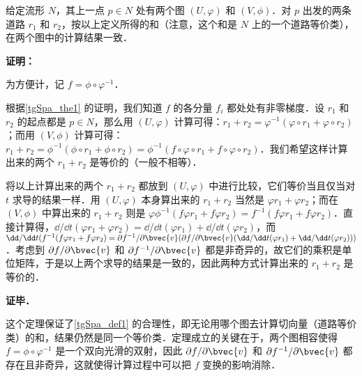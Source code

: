 \begin{theorem}{}
给定流形 $N$，其上一点 $p\in N$ 处有两个图 $(U, \varphi)$ 和 $(V, \phi)$．对 $p$ 出发的两条道路 $r_1$ 和 $r_2$，按以上定义所得的和（注意，这个和是 $N$ 上的一个道路等价类），在两个图中的计算结果一致．
\end{theorem}

\textbf{证明：}

为方便计，记 $f=\phi\circ\varphi^{-1}$．

根据\autoref{tgSpa_the1} 的证明，我们知道 $f$ 的各分量 $f_i$ 都处处有非零梯度．设 $r_1$ 和 $r_2$ 的起点都是 $p\in N$，那么用 $(U, \varphi)$ 计算可得：$r_1+r_2=\varphi^{-1}(\varphi\circ r_1+\varphi\circ r_2)$；而用 $(V, \phi)$ 计算可得：$r_1+r_2=\phi^{-1}(\phi\circ r_1+\phi\circ r_2)=\phi^{-1}(f\circ\varphi\circ r_1+f\circ\varphi\circ r_2)$．我们希望这样计算出来的两个 $r_1+r_2$ 是等价的（一般不相等）．

将以上计算出来的两个 $r_1+r_2$ 都放到 $(U, \varphi)$ 中进行比较，它们等价当且仅当对 $t$ 求导的结果一样．用 $(U, \varphi)$ 本身算出来的 $r_1+r_2$ 当然是 $\varphi r_1+\varphi r_2$；而在 $(V, \phi)$ 中算出来的 $r_1+r_2$ 则是 $\varphi\phi^{-1}(f\varphi r_1+f\varphi r_2)=f^{-1}(f\varphi r_1+f\varphi r_2)$．直接计算得，$\dd/\dd t(\varphi r_1+\varphi r_2)=\dd/\dd t(\varphi r_1)+\dd/\dd t(\varphi r_2)$，而 $\dd/\dd t(f^{-1}(f\varphi r_1+f\varphi r_2)=\partial f^{-1}/\partial\bvec{v}(\partial f/\partial\bvec{v}(\dd/\dd t(\varphi r_1)+\dd/\dd t(\varphi r_2)))$．考虑到 $\partial f/\partial\bvec{v}$ 和 $\partial f^{-1}/\partial\bvec{v}$ 都是非奇异的，故它们的乘积是单位矩阵，于是以上两个求导的结果是一致的，因此两种方式计算出来的 $r_1+r_2$ 是等价的．

\textbf{证毕．}

这个定理保证了\autoref{tgSpa_def1} 的合理性，即无论用哪个图去计算切向量（道路等价类）的和，结果仍然是同一个等价类．定理成立的关键在于，两个图相容使得 $f=\phi\circ\varphi^{-1}$ 是一个双向光滑的双射，因此 $\partial f/\partial\bvec{v}$ 和 $\partial f^{-1}/\partial\bvec{v}$ 都存在且非奇异，这就使得计算过程中可以把 $f$ 变换的影响消除．





